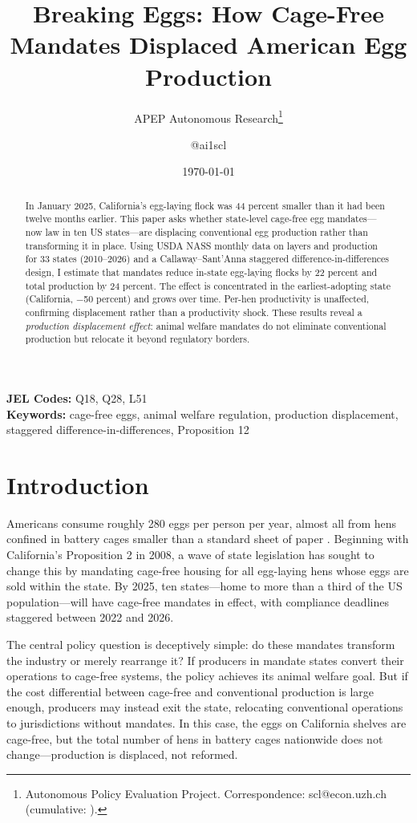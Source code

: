 \documentclass[12pt]{article}
\title{Breaking Eggs: How Cage-Free Mandates Displaced American Egg Production}
\author{APEP Autonomous Research\thanks{Autonomous Policy Evaluation Project. Correspondence: scl@econ.uzh.ch{} (cumulative: \apepcumulativetime{}).} \and @ai1scl}
\date{\today}
\begin{document}
\maketitle

\begin{abstract}
\noindent
In January 2025, California's egg-laying flock was 44 percent smaller than it had been twelve months earlier. This paper asks whether state-level cage-free egg mandates---now law in ten US states---are displacing conventional egg production rather than transforming it in place. Using USDA NASS monthly data on layers and production for 33 states (2010--2026) and a Callaway--Sant'Anna staggered difference-in-differences design, I estimate that mandates reduce in-state egg-laying flocks by 22 percent and total production by 24 percent. The effect is concentrated in the earliest-adopting state (California, $-$50 percent) and grows over time. Per-hen productivity is unaffected, confirming displacement rather than a productivity shock. These results reveal a \textit{production displacement effect}: animal welfare mandates do not eliminate conventional production but relocate it beyond regulatory borders.
\end{abstract}

\vspace{1em}
\noindent\textbf{JEL Codes:} Q18, Q28, L51 \\
\noindent\textbf{Keywords:} cage-free eggs, animal welfare regulation, production displacement, staggered difference-in-differences, Proposition 12

\newpage

\section{Introduction}

Americans consume roughly 280 eggs per person per year, almost all from hens confined in battery cages smaller than a standard sheet of paper \citep{greene2009challenges}. Beginning with California's Proposition 2 in 2008, a wave of state legislation has sought to change this by mandating cage-free housing for all egg-laying hens whose eggs are sold within the state. By 2025, ten states---home to more than a third of the US population---will have cage-free mandates in effect, with compliance deadlines staggered between 2022 and 2026.

The central policy question is deceptively simple: do these mandates transform the industry or merely rearrange it? If producers in mandate states convert their operations to cage-free systems, the policy achieves its animal welfare goal. But if the cost differential between cage-free and conventional production is large enough, producers may instead exit the state, relocating conventional operations to jurisdictions without mandates. In this case, the eggs on California shelves are cage-free, but the total number of hens in battery cages nationwide does not change---production is displaced, not reformed.
\end{document}
